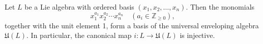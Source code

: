 Let $L$ be a Lie algebra with ordered basis $(x_1, x_2, \ldots, x_n)$. Then the monomials
$$x_1^{a_1} x_2^{a_2} \cdots x_n^{a_n} \quad (a_i \in \mathbb{Z}_{\geq 0}),$$
together with the unit element 1, form a basis of the universal enveloping algebra $\mathfrak{U}(L)$. In particular, the canonical map $i: L \rightarrow \mathfrak{U}(L)$ is injective.
